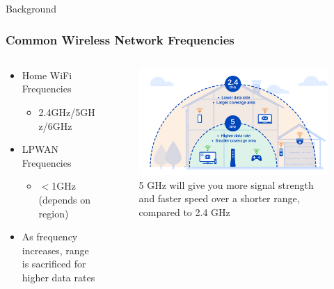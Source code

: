 \documentclass{beamer}
\begin{document}
\begin{frame}{Background}
  \frametitle{Common Wireless Network Frequencies}
  \begin{columns}
    \begin{column}{0.5\textwidth}
      \begin{itemize}
        \item Home WiFi Frequencies
          \begin{itemize}
            \item 2.4GHz/5GHz/6GHz
          \end{itemize}
        \item LPWAN Frequencies
          \begin{itemize}
            \item $<$1GHz (depends on region)
          \end{itemize}
        \item As frequency increases, range is sacrificed for higher data rates
      \end{itemize}
    \end{column}
    \begin{column}{0.5\textwidth}
      \begin{figure}[htbp]
        \centering
        \includegraphics[width=\textwidth]{FreguencyHouse.png}
        \caption{5 GHz will give you more signal strength and faster speed over a shorter range, 
        compared to 2.4 GHz \cite{CenturyLink}}
        \label{fig:FrequencyHouse}
      \end{figure}
  \end{column}
  \end{columns}
\end{frame}
\end{document}
